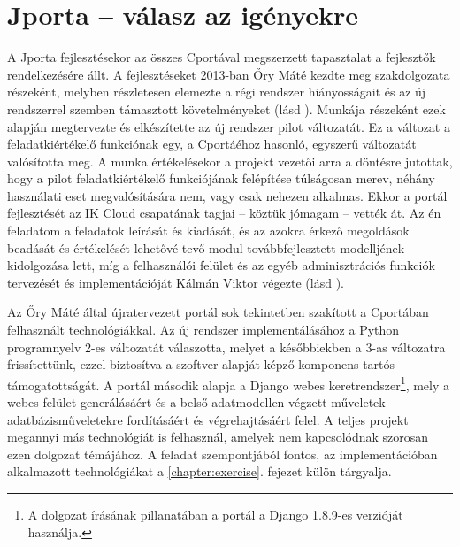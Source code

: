 \section{Jporta -- válasz az igényekre}
A Jporta fejlesztésekor az összes Cportával megszerzett tapasztalat a fejlesztők rendelkezésére állt.
A fejlesztéseket 2013-ban Őry Máté kezdte meg szakdolgozata részeként, melyben részletesen elemezte a régi rendszer hiányosságait és az új rendszerrel szemben támasztott követelményeket (lásd \cite{Ory13}).
Munkája részeként ezek alapján megtervezte és elkészítette az új rendszer pilot változatát.  
Ez a változat a feladatkiértékelő funkciónak egy, a Cportáéhoz hasonló, egyszerű változatát valósította meg.
A munka értékelésekor a projekt vezetői arra a döntésre jutottak, hogy a pilot feladatkiértékelő funkciójának felépítése túlságosan merev, néhány használati eset megvalósítására nem, vagy csak nehezen alkalmas. 
Ekkor a portál fejlesztését az IK Cloud csapatának tagjai -- köztük jómagam -- vették át.
Az én feladatom a feladatok leírását és kiadását, és az azokra érkező megoldások beadását és értékelését lehetővé tevő modul továbbfejlesztett modelljének kidolgozása lett, míg a felhasználói felület és az egyéb adminisztrációs funkciók tervezését és implementációját Kálmán Viktor végezte (lásd \cite{Kalman14}).

Az Őry Máté által újratervezett portál sok tekintetben szakított a Cportában felhasznált technológiákkal.
Az új rendszer implementálásához a Python programnyelv 2-es változatát válaszotta, melyet a későbbiekben a 3-as változatra frissítettünk, ezzel biztosítva a szoftver alapját képző komponens tartós támogatottságát. \cite{PEP373} \cite{Kalman14}
A portál második alapja a Django webes keretrendszer\footnote{A dolgozat írásának pillanatában a portál a Django 1.8.9-es verzióját használja.}, mely a webes felület generálásáért és a belső adatmodellen végzett műveletek adatbázisműveletekre fordításáért és végrehajtásáért felel. 
A teljes projekt megannyi más technológiát is felhasznál, amelyek nem kapcsolódnak szorosan ezen dolgozat témájához.
A feladat szempontjából fontos, az implementációban alkalmazott technológiákat a \ref{chapter:exercise}. fejezet külön tárgyalja.

